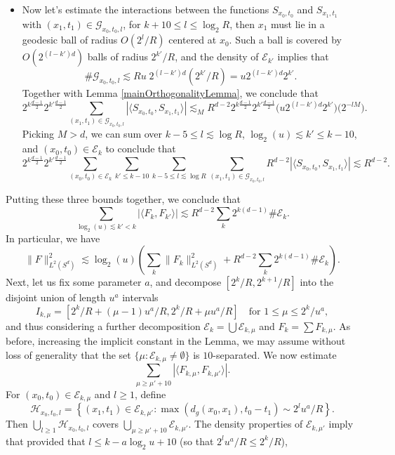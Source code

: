 \begin{itemize}
    \item Now let's estimate the interactions between the functions ${S\!}_{x_0,t_0}$ and ${S\!}_{x_1,t_1}$ with $(x_1,t_1) \in \mathcal{G}_{x_0,t_0,l}$, for $k + 10 \leq l \leq \log_2 R$, then $x_1$ must lie in a geodesic ball of radius $O(2^l/R)$ centered at $x_0$. Such a ball is covered by $O( 2^{(l-k')d} )$ balls of radius $2^{k'}/R$, and the density of $\mathcal{E}_{k'}$ implies that
    \[ \# \mathcal{G}_{x_0,t_0,l} \lesssim Ru\; 2^{(l-k')d} (2^{k'}/R) = u 2^{(l-k')d} 2^{k'}. \]
    Together with Lemma \ref{mainOrthogonalityLemma}, we conclude that
    \[ 2^{k \frac{d-1}{2}} 2^{k' \frac{d-1}{2}} \sum_{(x_1,t_1) \in \mathcal{G}_{x_0,t_0,l}} |\langle {S\!}_{x_0,t_0}, {S\!}_{x_1,t_1} \rangle| \lesssim_M R^{d-2} 2^{k \frac{d-1}{2}} 2^{k' \frac{d-1}{2}} \Big( u 2^{(l-k')d} 2^{k'} \Big) \Big( 2^{-lM} \Big). \]
    Picking $M > d$, we can sum over $k - 5 \leq l \lesssim \log R$, $\log_2(u) \lesssim k' \leq k - 10$, and $(x_0,t_0) \in \mathcal{E}_k$ to conclude that
    \[ 2^{k \frac{d-1}{2}} 2^{k' \frac{d-1}{2}} \sum_{(x_0,t_0) \in \mathcal{E}_k} \sum_{k' \leq k - 10} \sum_{k-5 \leq l \lesssim \log R} \sum_{(x_1,t_1) \in \mathcal{G}_{x_0,t_0,l}} R^{d-2} |\langle {S\!}_{x_0,t_0}, {S\!}_{x_1,t_1} \rangle| \lesssim R^{d-2}. \]
\end{itemize}
%
Putting these three bounds together, we conclude that
%
\[ \sum_{\log_2(u) \lesssim k' < k} |\langle F_k, F_{k'} \rangle| \lesssim R^{d-2} \sum_k 2^{k (d-1)} \# \mathcal{E}_k. \]
%
In particular, we have
%
\[ \| F \|_{L^2(S^d)}^2 \lesssim \log_2(u) \left( \sum_k \| F_k \|_{L^2(S^d)}^2 + R^{d-2} \sum_k 2^{k (d-1)} \# \mathcal{E}_k \right). \]
%
Next, let us fix some parameter $a$, and decompose $[2^k/R, 2^{k+1}/R]$ into the disjoint union of length $u^a$ intervals
%
\[ I_{k,\mu} = [ 2^k / R + (\mu - 1) u^a / R, 2^k / R + \mu u^a / R] \quad\text{for $1 \leq \mu \leq 2^k/u^a$}, \]
%
and thus considering a further decomposition $\mathcal{E}_k = \bigcup \mathcal{E}_{k,\mu}$ and $F_k = \sum F_{k,\mu}$. As before, increasing the implicit constant in the Lemma, we may assume without loss of generality that the set $\{ \mu: \mathcal{E}_{k,\mu} \neq \emptyset \}$ is $10$-separated. We now estimate
%
\[ \sum_{\mu \geq \mu' + 10} |\langle F_{k,\mu}, F_{k,\mu'} \rangle|. \]
%
For $(x_0,t_0) \in \mathcal{E}_{k,\mu}$ and $l \geq 1$, define
%
\[ \mathcal{H}_{x_0,t_0,l} = \left\{ (x_1,t_1) \in \mathcal{E}_{k,\mu'} : \max(d_g(x_0,x_1), t_0 - t_1) \sim 2^l u^a / R \right\}. \]
%
Then $\bigcup_{l \geq 1} \mathcal{H}_{x_0,t_0,l}$ covers $\bigcup_{\mu \geq \mu' + 10} \mathcal{E}_{k,\mu'}$. The density properties of $\mathcal{E}_{k,\mu'}$ imply that provided that $l \leq k - a \log_2 u + 10$ (so that $2^l u^a / R \leq 2^k / R$),
